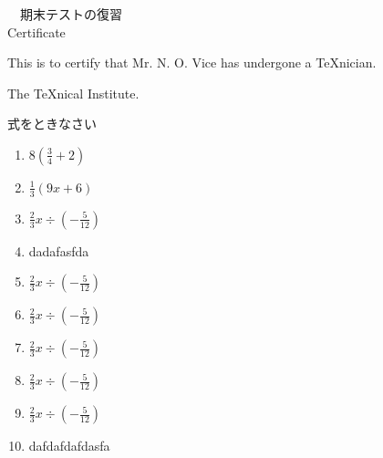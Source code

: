 \documentclass[fleqn]{jsarticle}
\begin{document}
\begin{center}
　期末テストの復習\\[.75cm] Certificate
\end{center}
\noindent This is to certify that Mr. N. O. Vice has undergone a \TeX nician.
\begin{flushright}
  The \TeX nical Institute.
\end{flushright}
  式をときなさい
\begin{multicols}{3}
\begin{enumerate}
  \item $\displaystyle8\left(\frac{3}{4} + 2\right)$ \\
  \item $\displaystyle \frac{1}{3}(9x +6)$\\
  \item $\displaystyle \frac{2}{3}x \div \left( - \frac{5}{12} \right)$ 
  \item dadafasfda\\
  \item $\displaystyle \frac{2}{3}x \div \left( - \frac{5}{12} \right)$ \\
  \item $\displaystyle \frac{2}{3}x \div \left( - \frac{5}{12} \right)$ \\
  \item $\displaystyle \frac{2}{3}x \div \left( - \frac{5}{12} \right)$ \\
  \item $\displaystyle \frac{2}{3}x \div \left( - \frac{5}{12} \right)$ 
  \item $\displaystyle \frac{2}{3}x \div \left( - \frac{5}{12} \right)$ 
  \item dafdafdafdasfa \\
\end{enumerate}
\end{multicols}
\end{document}
